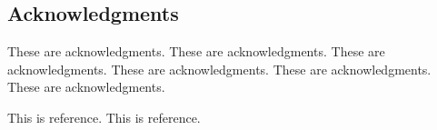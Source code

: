 \documentclass[hyperref]{ctexart}
\begin{document}
\begin{multicols}{2}
		\section*{Acknowledgments}
		These are acknowledgments. These are acknowledgments. These are acknowledgments. These are acknowledgments. These are acknowledgments. These are acknowledgments.
		\begin{thebibliography}{100}%
			This is reference.%
			This is reference.%
		\end{thebibliography}
	\end{multicols}
\end{document}
